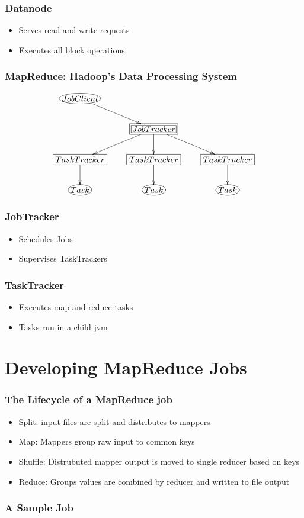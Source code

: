 \documentclass{beamer}
\begin{document}
\frame 
{
  \frametitle{Datanode}
  \begin{itemize}
    \item Serves read and write requests
    \item Executes all block operations
  \end{itemize}  
}


\frame
{
  \frametitle{MapReduce: Hadoop's Data Processing System}
  \begin{displaymath}
    \xymatrix{ 
      *+[Fe:blue]{JobClient} \ar[dr] & & \\
      & *+[F=:magenta]{JobTracker} \ar[dl] \ar[d] \ar[dr] \\
      *+[F]{TaskTracker} \ar[d] & *+[F]{TaskTracker} \ar[d] & *+[F]{TaskTracker} \ar[d] \\
      *+[Fe]{Task} & *+[Fe]{Task} & *+[Fe]{Task}
    }
  \end{displaymath}
}


\frame 
{
  \frametitle{JobTracker}
  \begin{itemize}
    \item Schedules Jobs
    \item Supervises TaskTrackers
  \end{itemize}
}

\frame 
{
  \frametitle{TaskTracker}
  \begin{itemize}
    \item Executes map and reduce tasks
    \item Tasks run in a child jvm
  \end{itemize}
}

\section{Developing MapReduce Jobs}

\frame
{
  \frametitle{The Lifecycle of a MapReduce job}
  \begin{itemize}
    \item Split: input files are split and distributes to mappers
    \item Map: Mappers group raw input to common keys
    \item Shuffle: Distrubuted mapper output is moved to single reducer based on
      keys
    \item Reduce: Groups values are combined by reducer and written to file
      output
  \end{itemize}
}

\frame
{
  \frametitle{A Sample Job}
}
\end{document}
